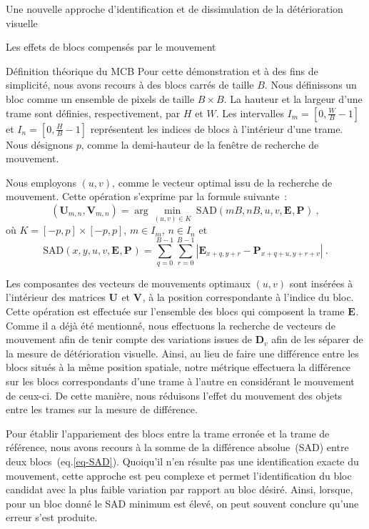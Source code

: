 \documentclass[letterpaper, twoside, 12pt,memoire]{thETS}
\newcommand{\SC}[1]{%
	{
	\todo[inline,color={red!100!green!33!}]{%
	\textbf{[SC]:}~#1}
	}}
\newcommand{\ltE}[1]{\mathbf{E}_{#1}}
\newcommand{\ltP}[1]{\mathbf{P}_{#1}}
\newcommand{\ltD}[1]{\mathbf{D}_{#1}}
\newcommand{\ltS}[1]{I_{#1}}
\newcommand{\ltSAD}[1]{\textrm{SAD}(#1)}
\newcommand{\ltMIN}[1]{\arg \min_{#1}}
\providecommand{\DIFaddbegin}{} %
\providecommand{\DIFaddend}{} %
\begin{document}
\begin{chapter}{Une nouvelle approche d'identification et de dissimulation de la
détérioration visuelle}
\begin{section}{Les effets de blocs compensés par le mouvement}
\FloatBarrier
\begin{subsection}{Définition théorique du MCB}
\label{subsect-theorique}
Pour cette démonstration et à des fins de simplicité, nous avons recours à des
blocs carrés de taille $B$. Nous définissons un bloc comme un ensemble de pixels de taille
$B\times B$. La hauteur et la largeur d'une trame sont définies, respectivement,
par $H$ et $W$. Les intervalles $\ltS{m}=[0,\frac{W}{B}-1]$ et
$\ltS{n}=[0,\frac{H}{B}-1]$ représentent les indices de blocs à l'intérieur
d'une trame. Nous désignons $p$, comme la demi-hauteur de la fenêtre de
recherche de mouvement.

Nous employons $(u,v)$, comme le vecteur optimal issu de la recherche de
mouvement. Cette opération s'exprime par la formule suivante~: 
\begin{equation}
\label{eq-Vectors}
(\mathbf{U}_{m,n}, \mathbf{V}_{m,n}) = \ltMIN{(u,v) \in K} ~ \ltSAD{mB, nB, u,
v, \ltE{}, \ltP{}} \:,
\end{equation}
où $K = [-p,p] \times [-p, p]$,  $m \in \ltS{m}$, $n \in
\ltS{n}$ et
\begin{equation}
\label{eq-SAD}
\ltSAD{x,y,u,v, \ltE{}, \ltP{}} = \sum_{q=0}^{B-1}\sum_{r=0}^{B-1} \left|
\ltE{x+q,y+r} - \ltP{x+q+u,y+r+v} \right|\:.
\end{equation}

Les composantes des vecteurs de mouvements optimaux $(u,v)$ sont insérées à l'intérieur
des matrices $\mathbf{U}_{}$ et $\mathbf{V}_{}$, à la position correspondante à
l'indice du bloc. Cette opération est effectuée sur l'ensemble des blocs qui
composent la trame $\ltE{}$. Comme il a déjà été mentionné, nous effectuons la
recherche de vecteurs de mouvement afin de tenir compte des variations issues de
$\ltD{v}$ afin de les séparer de la mesure de détérioration visuelle. Ainsi, au lieu de faire une différence entre les blocs situés à la même position spatiale, notre métrique effectuera la différence sur les blocs correspondants d'une trame à l'autre en considérant le mouvement de ceux-ci. De cette manière, nous réduisons l'effet du mouvement des objets entre les trames  sur la mesure de différence.\DIFaddbegin \SC{pixel entier, quart, demi pixel?}
\DIFaddend 

Pour établir l'appariement des blocs entre la trame erronée et la trame de
référence, nous avons recours à la somme de la différence absolue~(SAD) entre
deux blocs~(eq.\ref{eq-SAD}). Quoiqu'il n'en résulte pas une identification
exacte du mouvement, cette approche est peu complexe et permet l'identification
du bloc candidat avec la plus faible variation par rapport au bloc désiré. Ainsi, lorsque, pour un bloc donné le SAD minimum est élevé, on peut souvent conclure qu'une erreur s'est produite.


\end{subsection}
\end{section}
\end{chapter}
\end{document}
